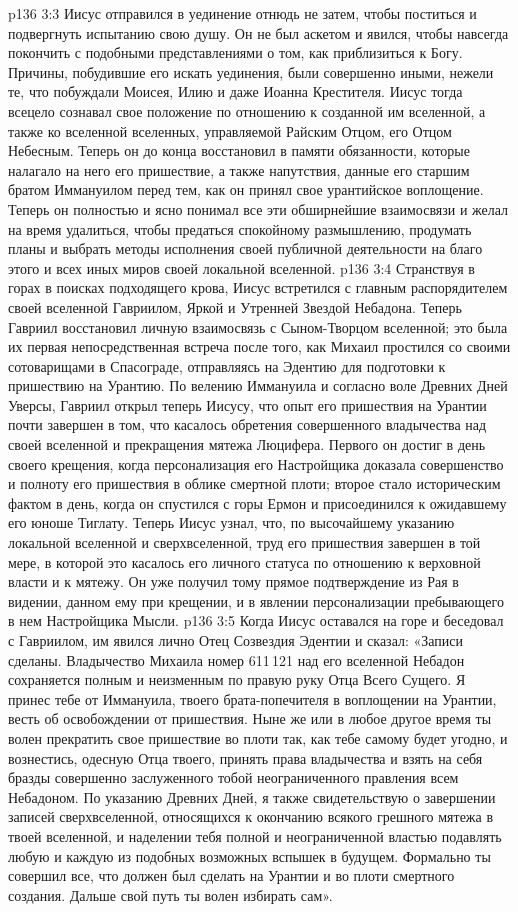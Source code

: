 \vs p136 3:3 Иисус отправился в уединение отнюдь не затем, чтобы поститься и подвергнуть испытанию свою душу. Он не был аскетом и явился, чтобы навсегда покончить с подобными представлениями о том, как приблизиться к Богу. Причины, побудившие его искать уединения, были совершенно иными, нежели те, что побуждали Моисея, Илию и даже Иоанна Крестителя. Иисус тогда всецело сознавал свое положение по отношению к созданной им вселенной, а также ко вселенной вселенных, управляемой Райским Отцом, его Отцом Небесным. Теперь он до конца восстановил в памяти обязанности, которые налагало на него его пришествие, а также напутствия, данные его старшим братом Иммануилом перед тем, как он принял свое урантийское воплощение. Теперь он полностью и ясно понимал все эти обширнейшие взаимосвязи и желал на время удалиться, чтобы предаться спокойному размышлению, продумать планы и выбрать методы исполнения своей публичной деятельности на благо этого и всех иных миров своей локальной вселенной.
\vs p136 3:4 \pc Странствуя в горах в поисках подходящего крова, Иисус встретился с главным распорядителем своей вселенной Гавриилом, Яркой и Утренней Звездой Небадона. Теперь Гавриил восстановил личную взаимосвязь с Сыном\hyp{}Творцом вселенной; это была их первая непосредственная встреча после того, как Михаил простился со своими сотоварищами в Спасограде, отправляясь на Эдентию для подготовки к пришествию на Урантию. По велению Иммануила и согласно воле Древних Дней Уверсы, Гавриил открыл теперь Иисусу, что опыт его пришествия на Урантии почти завершен в том, что касалось обретения совершенного владычества над своей вселенной и прекращения мятежа Люцифера. Первого он достиг в день своего крещения, когда персонализация его Настройщика доказала совершенство и полноту его пришествия в облике смертной плоти; второе стало историческим фактом в день, когда он спустился с горы Ермон и присоединился к ожидавшему его юноше Тиглату. Теперь Иисус узнал, что, по высочайшему указанию локальной вселенной и сверхвселенной, труд его пришествия завершен в той мере, в которой это касалось его личного статуса по отношению к верховной власти и к мятежу. Он уже получил тому прямое подтверждение из Рая в видении, данном ему при крещении, и в явлении персонализации пребывающего в нем Настройщика Мысли.
\vs p136 3:5 Когда Иисус оставался на горе и беседовал с Гавриилом, им явился лично Отец Созвездия Эдентии и сказал: «Записи сделаны. Владычество Михаила номер 611\,121 над его вселенной Небадон сохраняется полным и неизменным по правую руку Отца Всего Сущего. Я принес тебе от Иммануила, твоего брата\hyp{}попечителя в воплощении на Урантии, весть об освобождении от пришествия. Ныне же или в любое другое время ты волен прекратить свое пришествие во плоти так, как тебе самому будет угодно, и вознестись, одесную Отца твоего, принять права владычества и взять на себя бразды совершенно заслуженного тобой неограниченного правления всем Небадоном. По указанию Древних Дней, я также свидетельствую о завершении записей сверхвселенной, относящихся к окончанию всякого грешного мятежа в твоей вселенной, и наделении тебя полной и неограниченной властью подавлять любую и каждую из подобных возможных вспышек в будущем. Формально ты совершил все, что должен был сделать на Урантии и во плоти смертного создания. Дальше свой путь ты волен избирать сам».

